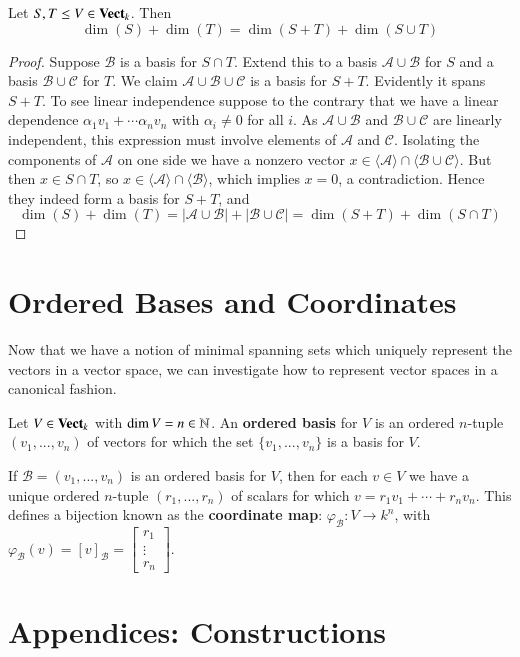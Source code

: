 \begin{theorem}
    Let $S,T \leq V \in \normalfont\textbf{Vect}_{k}$. Then \begin{equation*}
        \dim(S) + \dim(T) = \dim(S+T) + \dim(S\cup T)
    \end{equation*}
\end{theorem}
\begin{proof}
    Suppose $\mathcal{B}$ is a basis for $S\cap T$. Extend this to a basis $\mathcal{A}\cup\mathcal{B}$ for $S$ and a basis $\mathcal{B}\cup\mathcal{C}$ for $T$. We claim $\mathcal{A}\cup\mathcal{B}\cup\mathcal{C}$ is a basis for $S+T$. Evidently it spans $S+T$. To see linear independence suppose to the contrary that we have a linear dependence $\alpha_1v_1+\cdots \alpha_nv_n$ with $\alpha_i \neq 0$ for all $i$. As $\mathcal{A}\cup\mathcal{B}$ and $\mathcal{B}\cup\mathcal{C}$ are linearly independent, this expression must involve elements of $\mathcal{A}$ and $\mathcal{C}$. Isolating the components of $\mathcal{A}$ on one side we have a nonzero vector $x \in \langle \mathcal{A}\rangle \cap\langle \mathcal{B}\cup\mathcal{C}\rangle$. But then $x \in S\cap T$, so $x \in \langle \mathcal{A}\rangle \cap \langle \mathcal{B}\rangle$, which implies $x = 0$, a contradiction. Hence they indeed form a basis for $S+T$, and \begin{equation*}
        \dim(S)+\dim(T) = |\mathcal{A}\cup\mathcal{B}|+|\mathcal{B}\cup\mathcal{C}| = \dim(S+T) + \dim(S\cap T)
    \end{equation*}
\end{proof}


\section{Ordered Bases and Coordinates}\label{sec:coord}

Now that we have a notion of minimal spanning sets which uniquely represent the vectors in a vector space, we can investigate how to represent vector spaces in a canonical fashion. 

\begin{definition}
    Let $V \in \normalfont\textbf{Vect}_{k}$ with $\dim V = n \in \mathbb N$. An \textbf{ordered basis} for $V$ is an ordered $n$-tuple $(v_1,...,v_n)$ of vectors for which the set $\{v_1,...,v_n\}$ is a basis for $V$.
\end{definition}

If $\mathcal{B} = (v_1,...,v_n)$ is an ordered basis for $V$, then for each $v \in V$ we have a unique ordered $n$-tuple $(r_1,...,r_n)$ of scalars for which $v = r_1v_1+\cdots +r_nv_n$. This defines a bijection known as the \textbf{coordinate map}: $\varphi_{\mathcal{B}}:V\rightarrow k^n$, with $\varphi_{\mathcal{B}}(v) = [v]_{\mathcal{B}} = \begin{bmatrix} r_1 \\ \vdots \\ r_n\end{bmatrix}$. 




%
\section*{Appendices: Constructions}
%
